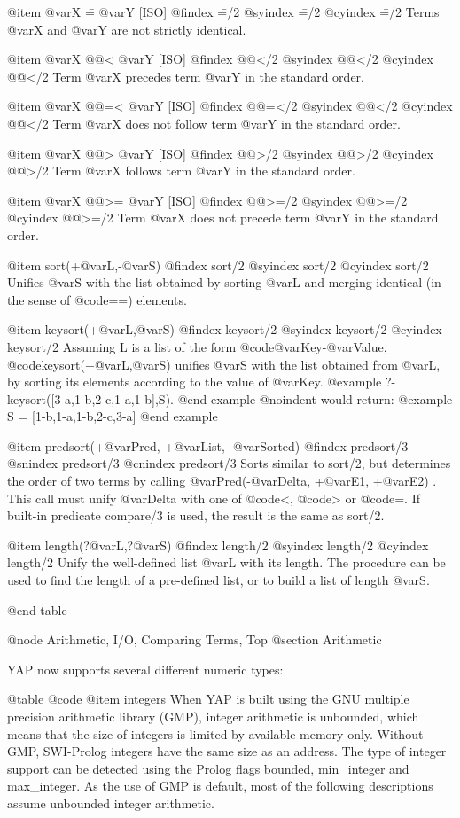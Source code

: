 {{{{@item @var{X} \== @var{Y} [ISO]
@findex \==/2
@syindex \==/2
@cyindex \==/2
Terms @var{X} and @var{Y} are not strictly identical.

@item @var{X} @@< @var{Y} [ISO]
@findex @@</2
@syindex @@</2
@cyindex @@</2
Term @var{X} precedes term @var{Y} in the standard order.

@item @var{X} @@=< @var{Y} [ISO]
@findex @@=</2
@syindex @@</2
@cyindex @@</2
Term @var{X} does not follow term @var{Y} in the standard order.

@item @var{X} @@> @var{Y} [ISO]
@findex @@>/2
@syindex @@>/2
@cyindex @@>/2
Term @var{X} follows term @var{Y} in the standard order.

@item @var{X} @@>= @var{Y} [ISO]
@findex @@>=/2
@syindex @@>=/2
@cyindex @@>=/2
Term @var{X} does not precede term @var{Y} in the standard order.

@item sort(+@var{L},-@var{S})
@findex sort/2
@syindex sort/2
@cyindex sort/2
Unifies @var{S} with the list obtained by sorting @var{L} and  merging
identical (in the sense of @code{==}) elements.

@item keysort(+@var{L},@var{S})
@findex keysort/2
@syindex keysort/2
@cyindex keysort/2
Assuming L is a list of the form @code{@var{Key}-@var{Value}},
@code{keysort(+@var{L},@var{S})} unifies @var{S} with the list obtained
from @var{L}, by sorting its elements according to the value of
@var{Key}.
@example
?- keysort([3-a,1-b,2-c,1-a,1-b],S).
@end example
@noindent
would return:
@example
S = [1-b,1-a,1-b,2-c,3-a]
@end example

@item predsort(+@var{Pred}, +@var{List}, -@var{Sorted})
@findex predsort/3
@snindex predsort/3
@cnindex predsort/3
Sorts similar to sort/2, but determines the order of two terms by
calling @var{Pred}(-@var{Delta}, +@var{E1}, +@var{E2}) . This call must
unify @var{Delta} with one of @code{<}, @code{>} or @code{=}. If
built-in predicate compare/3 is used, the result is the same as
sort/2.

@item length(?@var{L},?@var{S})
@findex length/2
@syindex length/2
@cyindex length/2
Unify the well-defined list @var{L} with its length. The procedure can
be used to find the length of a pre-defined list, or to build a list
of length @var{S}.

@end table

@node Arithmetic, I/O, Comparing Terms, Top
@section Arithmetic

YAP now supports several different numeric types:

@table @code
@item integers
      When YAP is built using the GNU multiple precision arithmetic
      library (GMP), integer arithmetic is unbounded, which means that
      the size of integers is limited by available memory only. Without
      GMP, SWI-Prolog integers have the same size as an address. The
      type of integer support can be detected using the Prolog flags
      bounded, min_integer and max_integer. As the use of GMP is
      default, most of the following descriptions assume unbounded
      integer arithmetic.

}}}}
